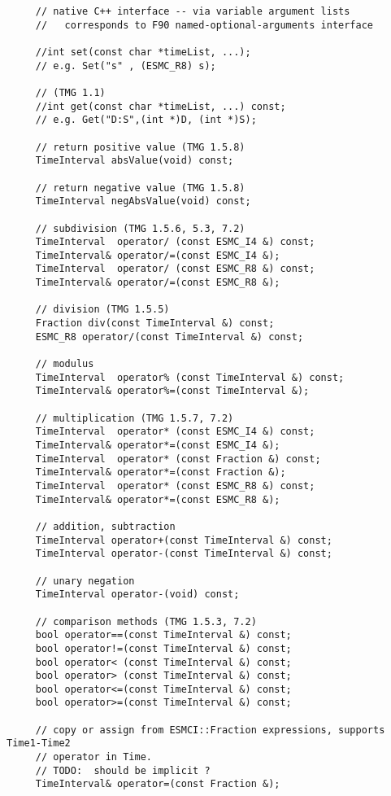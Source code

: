 \begin{verbatim}
     // native C++ interface -- via variable argument lists
     //   corresponds to F90 named-optional-arguments interface
 
     //int set(const char *timeList, ...);
     // e.g. Set("s" , (ESMC_R8) s);
 
     // (TMG 1.1)
     //int get(const char *timeList, ...) const;
     // e.g. Get("D:S",(int *)D, (int *)S);
 
     // return positive value (TMG 1.5.8)
     TimeInterval absValue(void) const;
 
     // return negative value (TMG 1.5.8)
     TimeInterval negAbsValue(void) const;
 
     // subdivision (TMG 1.5.6, 5.3, 7.2)
     TimeInterval  operator/ (const ESMC_I4 &) const;
     TimeInterval& operator/=(const ESMC_I4 &);
     TimeInterval  operator/ (const ESMC_R8 &) const;
     TimeInterval& operator/=(const ESMC_R8 &);
 
     // division (TMG 1.5.5)
     Fraction div(const TimeInterval &) const;
     ESMC_R8 operator/(const TimeInterval &) const;
 
     // modulus
     TimeInterval  operator% (const TimeInterval &) const;
     TimeInterval& operator%=(const TimeInterval &);
 
     // multiplication (TMG 1.5.7, 7.2)
     TimeInterval  operator* (const ESMC_I4 &) const;
     TimeInterval& operator*=(const ESMC_I4 &);
     TimeInterval  operator* (const Fraction &) const;
     TimeInterval& operator*=(const Fraction &);
     TimeInterval  operator* (const ESMC_R8 &) const;
     TimeInterval& operator*=(const ESMC_R8 &);
 
     // addition, subtraction
     TimeInterval operator+(const TimeInterval &) const;
     TimeInterval operator-(const TimeInterval &) const;
 
     // unary negation
     TimeInterval operator-(void) const;
 
     // comparison methods (TMG 1.5.3, 7.2)
     bool operator==(const TimeInterval &) const;
     bool operator!=(const TimeInterval &) const;
     bool operator< (const TimeInterval &) const;
     bool operator> (const TimeInterval &) const;
     bool operator<=(const TimeInterval &) const;
     bool operator>=(const TimeInterval &) const;
 
     // copy or assign from ESMCI::Fraction expressions, supports Time1-Time2
     // operator in Time.
     // TODO:  should be implicit ?
     TimeInterval& operator=(const Fraction &);
 

\end{verbatim}
